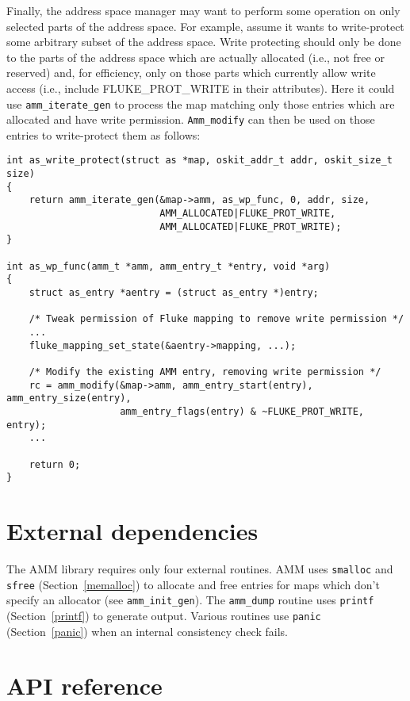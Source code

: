 Finally, the address space manager may want to perform some operation on
only selected parts of the address space.
For example, assume it wants to write-protect some arbitrary subset of the
address space.
Write protecting should only be done to the parts of the address space which
are actually allocated (i.e., not free or reserved) and, for efficiency,
only on those parts which currently allow write access
(i.e., include FLUKE_PROT_WRITE in their attributes).
Here it could use {\tt amm_iterate_gen} to process the map matching only
those entries which are allocated and have write permission.
{\tt Amm_modify} can then be used on those entries to write-protect them
as follows:
\begin{codefrag}
\footnotesize
\begin{verbatim}
int as_write_protect(struct as *map, oskit_addr_t addr, oskit_size_t size)
{
    return amm_iterate_gen(&map->amm, as_wp_func, 0, addr, size,
                           AMM_ALLOCATED|FLUKE_PROT_WRITE,
                           AMM_ALLOCATED|FLUKE_PROT_WRITE);
}

int as_wp_func(amm_t *amm, amm_entry_t *entry, void *arg)
{
    struct as_entry *aentry = (struct as_entry *)entry;

    /* Tweak permission of Fluke mapping to remove write permission */
    ...
    fluke_mapping_set_state(&aentry->mapping, ...);

    /* Modify the existing AMM entry, removing write permission */
    rc = amm_modify(&map->amm, amm_entry_start(entry), amm_entry_size(entry),
                    amm_entry_flags(entry) & ~FLUKE_PROT_WRITE, entry);
    ...

    return 0;
}
\end{verbatim}
\end{codefrag}

\section{External dependencies}

The AMM library requires only four external routines.
AMM uses {\tt smalloc} and {\tt sfree} (Section~\ref{memalloc})
to allocate and free entries 
for maps which don't specify an allocator (see {\tt amm_init_gen}).
The {\tt amm_dump} routine uses {\tt printf} (Section~\ref{printf})
to generate output.
Various routines use {\tt panic} (Section~\ref{panic}) when an internal
consistency check fails.

\section{API reference}
\label{amm-api}

